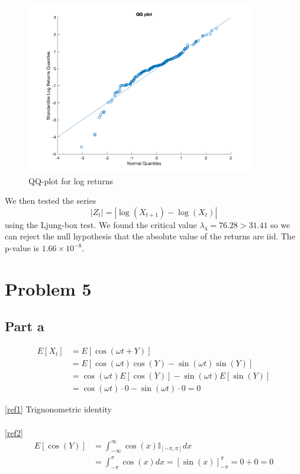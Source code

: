 \documentclass{article}
\begin{document}
\begin{figure}[H]
\includegraphics[width=10cm]{plots/qqplot.png}
\centering
\caption{QQ-plot for log returns}
\label{fig:qqplot}
\end{figure}

We then tested the series
$$
|Z_t| = |\log(X_{t + 1}) - \log(X_t)|
$$
using the Ljung-box test.
We found the critical value $\lambda_4 = 76.28 > 31.41$ so we can reject the null hypothesis that the absolute value of the returns are iid.
The p-value is $1.66 \times 10^{-8}$.

\section*{Problem 5}
\subsection*{Part a}

\begin{align}
    E[X_t] &= E[\cos(\omega t + Y)] \nonumber\\
    &= E[\cos(\omega t) \cos(Y) - \sin(\omega t) \sin(Y)]  \label{ref1}\\
    &= \cos(\omega t) E[\cos(Y)] - \sin(\omega t) E[\sin(Y)] \nonumber\\
    &= \cos(\omega t) \cdot 0 - \sin(\omega t) \cdot 0 = 0  \label{ref2}
\end{align}

\noindent \eqref{ref1} Trignonometric identity \\
\\
\eqref{ref2}
\begin{align*}
E[\cos(Y)] &= \int_{-\infty}^{\infty} \cos(x) \mathbb{I}_{[-\pi, \pi]} dx \\
&= \int_{-\pi}^{\pi} \cos(x) dx = [\sin(x)]^{\pi}_{-\pi} = 0 + 0 = 0
\end{align*}
\end{document}
